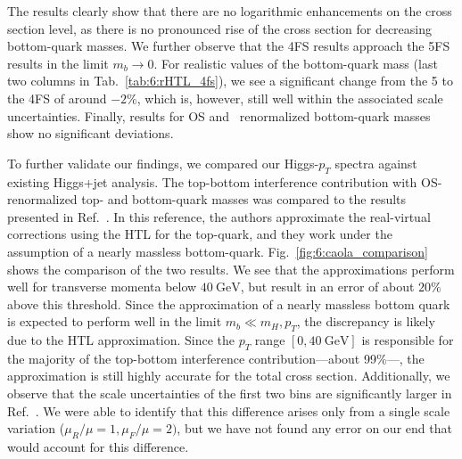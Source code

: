 The results clearly show that there are no logarithmic enhancements on the cross section level, as there is no pronounced rise of the cross section for decreasing bottom-quark masses. We further observe that the 4\acs{FS} results approach the 5\acs{FS} results in the limit $m_b \rightarrow 0$. For realistic values of the bottom-quark mass (last two columns in Tab.~\ref{tab:6:rHTL_4fs}), we see a significant change from the 5 to the 4\acs{FS} of around $-2\%$, which is, however, still well within the associated scale uncertainties. Finally, results for \acs{OS} and \MS\ renormalized bottom-quark masses show no significant deviations.

To further validate our findings, we compared our Higgs-$p_T$ spectra against existing Higgs+jet analysis. The top-bottom interference contribution with \acs{OS}-renormalized top- and bottom-quark masses was compared to the results presented in Ref.~\cite{Caola:2018zye}. In this reference, the authors approximate the real-virtual corrections using the \acs{HTL} for the top-quark, and they work under the assumption of a nearly massless bottom-quark. Fig.~\ref{fig:6:caola_comparison} shows the comparison of the two results. We see that the approximations perform well for transverse momenta below $40\ \mathrm{GeV}$, but result in an error of about $20\%$ above this threshold. Since the approximation of a nearly massless bottom quark is expected to perform well in the limit $m_b \ll m_H, p_T$, the discrepancy is likely due to the \acs{HTL} approximation. Since the $p_T$ range $[0, 40\ \mathrm{GeV}]$ is responsible for the majority of the top-bottom interference contribution---about 99\%---, the approximation is still highly accurate for the total cross section. Additionally, we observe that the scale uncertainties of the first two bins are significantly larger in Ref.~\cite{Caola:2018zye}. We were able to identify that this difference arises only from a single scale variation ($\mu_R/\mu = 1, \mu_F/\mu = 2)$, but we have not found any error on our end that would account for this difference.
